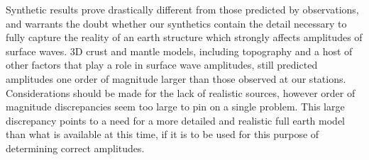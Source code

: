\documentclass{gji}
\begin{document}
Synthetic results prove drastically different from those predicted by observations, and warrants the doubt whether our synthetics contain the detail necessary to fully capture the reality of an earth structure which strongly affects amplitudes of surface waves. 3D crust and mantle models, including topography and a host of other factors that play a role in surface wave amplitudes, still predicted amplitudes one order of magnitude larger than those observed at our stations. Considerations should be made for the lack of realistic sources, however order of magnitude discrepancies seem too large to pin on a single problem. This large discrepancy points to a need for a more detailed and realistic full earth model than what is available at this time, if it is to be used for this purpose of determining correct amplitudes.
\end{document}
